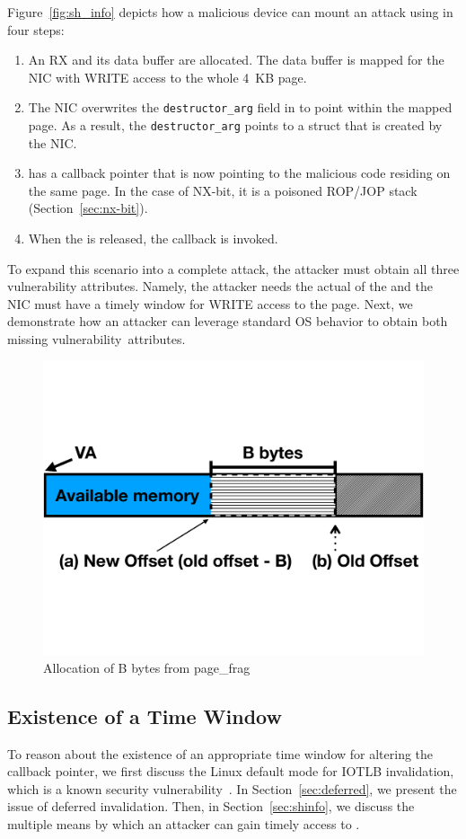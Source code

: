 Figure~\ref{fig:sh_info} depicts how a malicious device can mount an attack using \shinfo{} in four steps:
\begin{enumerate}[label=(\alph*)]
    \item An RX \skb{} and its data buffer are allocated. The data buffer is mapped for the NIC with WRITE access to the whole 4~KB page. 
    \item The NIC overwrites the \texttt{destructor\_arg} field in \shinfo{} to point within the mapped page. As a result, the \texttt{destructor\_arg} points to a struct \uarg{} that is created by the NIC.
    \item \uarg{} has a callback pointer that is now pointing to the malicious code residing on the same page. In the case of NX-bit, it is a poisoned ROP/JOP\cite{BJFL11} stack (Section~\ref{sec:nx-bit}).
    \item When the \skb{} is released, the callback is invoked.
\end{enumerate}
To expand this scenario into a complete attack, the attacker must obtain all three vulnerability attributes. Namely, the attacker needs the actual \kva{} of the \mabaf{} and the NIC must have a timely window for WRITE access to the page. Next, we demonstrate how an attacker can leverage standard OS behavior to obtain both missing \mbox{vulnerability attributes.}

\begin{figure}[t]
    \centering
    \includegraphics[width=0.65\linewidth,trim=0 6cm 0 6cm, clip]{figs/page_frag.pdf}
    \caption{Allocation of B bytes from page\_frag}
    \label{fig:page_frags}
\end{figure}

\subsection{Existence of a Time Window}\label{sec:timely}
To reason about the existence of an appropriate time window for altering the callback pointer, we first discuss the Linux default mode for IOTLB invalidation, which is a known security vulnerability~\cite{MMT16,MSMT18}.
In Section~\ref{sec:deferred}, we present the issue of deferred invalidation. Then, in Section~\ref{sec:shinfo}, we discuss the multiple means by which an attacker can gain timely access to \shinfo.

